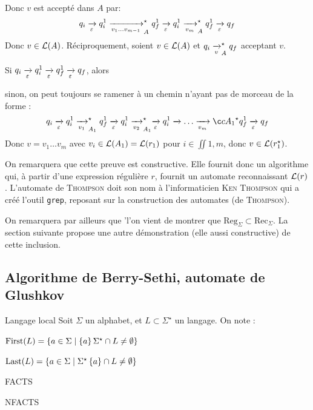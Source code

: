 \begin{nproof}
\begin{enumerate}
            Donc $v$ est accepté dans $A$ par:    
            \[ q_i \lima{\epsilon} q_i^1 \lima{v_1 \dots v_{m-1}}_A^\star q_f^1 \lima{\epsilon} q_i^1 \lima{v_m}_A^\star q_f^1 \lima{\epsilon} q_f \]
            Donc $v \in \mathcal{L}\!\left(A\right)$. Réciproquement, soient $v \in \mathcal{L}\!\left(A\right)$ et $q_i \lima{v}_A^\star q_f$ acceptant $v$.
            \begin{enumerate}
                \ithand Si $q_i \lima{\epsilon} q_i^1 \lima{\epsilon} q_f^1 \lima{\epsilon} q_f$, alors 
                
                \ithand 
                
                \ithand sinon, on peut toujours se ramener à un chemin n'ayant pas de morceau de la forme :
                \[ q_i \lima{\epsilon} q_i^1 \lima{v_1}_{A_1}^\star q_f^1 \lima{\epsilon} q_i^1 \lima{v_2}_{A_1}^\star \lima{\epsilon} q_i^1 \lima \dots \lima{v_m}ç{A_1}^\star q_f^1 \lima{\epsilon} q_f\]
                Donc $v =v_1 \dots v_m$ avec $v_i \in \mathcal{L}\!\left(A_1\right) = \mathcal{L}\!\left(r_1\right)$ pour $i \in \iint{1, m}$, donc $v \in \mathcal{L}\!\left(r_1^\star\right)$.
             \end{enumerate}
        \end{enumerate}
    \end{nproof}
    
    On remarquera que cette preuve est constructive. Elle fournit donc un algorithme qui, à partir d'une expression régulière $r$, fournit un automate reconnaissant $\mathcal{L}\!\left(r\right)$. L'automate de \textsc{Thompson} doit son nom à l'informaticien \textsc{Ken Thompson} qui a créé l'outil \texttt{grep}, reposant sur la construction des automates (de \textsc{Thompson}). 
    
    On remarquera par ailleurs que 'l'on vient de montrer que $\mathrm{Reg}_\Sigma \subset \mathrm{Rec}_\Sigma$. La section suivante propose une autre démonstration (elle aussi constructive) de cette inclusion.
    
    \subsection{Algorithme de Berry-Sethi, automate de Glushkov}
        
    \begin{definition}{Langage local}{}
        Soit $\Sigma$ un alphabet, et $L \subset \Sigma^\star$ un langage. On note :
        \begin{enumerate}
            \itast $\First\p{L} = \ens{a \in \Sigma \enstq \ens{a}\Sigma^\star \cap L \neq \emptyset}$
            
            \itast $\Last\p{L} = \ens{a \in \Sigma \enstq \Sigma^\star\ens{a} \cap L \neq \emptyset}$
            
            \itast FACTS
            
            \itast NFACTS
        \end{enumerate}
    \end{definition}
    
